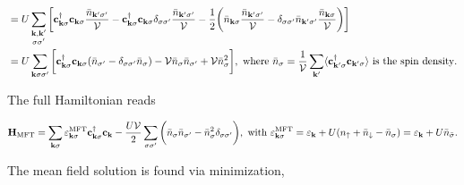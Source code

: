 \documentclass{homework}
\begin{document}
\begin{align*}
          &= U \sum_{\substack{{\bf k}, {\bf k}'\\
          {\sigma \sigma'}}} \bigg[ {\bf c}_{{\bf k}\sigma}^\dagger {\bf c}_{{\bf k}\sigma} \frac{\bar{n}_{{\bf k'} \sigma'}}{\mathcal{V}} - {\bf c}_{{\bf k}\sigma}^\dagger {\bf c}_{{\bf k}\sigma} \delta_{\sigma \sigma'} \frac{\bar{n}_{{\bf k'} \sigma'}}{\mathcal{V}} - \frac{1}{2} \bigg(\bar{n}_{{\bf k} \sigma} \frac{\bar{n}_{{\bf k'} \sigma'}}{\mathcal{V}} - \delta_{\sigma \sigma'} \bar{n}_{{\bf k'} \sigma'} \frac{\bar{n}_{{\bf k} \sigma}}{\mathcal{V}} \bigg)\bigg] \\
          &= U \sum_{{\bf k} \sigma \sigma'} \bigg[{\bf c}_{{\bf k}\sigma}^\dagger {\bf c}_{{\bf k}\sigma} (\bar{n}_{\sigma'} - \delta_{\sigma \sigma'} \bar{n}_{\sigma}) - \mathcal{V} \bar{n}_{\sigma} \bar{n}_{\sigma'} + \mathcal{V} \bar{n}_{\sigma}^2   \bigg], \textnormal{ where } \bar{n}_{\sigma} = \frac{1}{\mathcal{V}} \sum_{{\bf k'}} \langle {\bf c}_{{\bf k'}\sigma}^\dagger {\bf c}_{{\bf k'}\sigma} \rangle \textnormal{ is the spin density}.
\end{align*}

The full Hamiltonian reads

\begin{equation}
    {\bf H}_{\textnormal{MFT}} = \sum_{{\bf k} \sigma} \varepsilon_{{\bf k} \sigma}^{\textnormal{MFT}} {\bf c}_{{\bf k}\sigma}^\dagger {\bf c}_{{\bf k}} - \frac{U \mathcal{V}}{2} \sum_{\sigma \sigma'} \bigg( \bar{n}_{\sigma} \bar{n}_{\sigma'} - \bar{n}_{\sigma}^2 \delta_{\sigma \sigma'} \bigg), \textnormal{ with } \varepsilon_{{\bf k} \sigma}^{\textnormal{MFT}} = \varepsilon_{{\bf k}} + U(n_\uparrow + {\bar n}_\downarrow - \bar{n}_\sigma) = \varepsilon_{\bf k} + U\bar{n}_{\bar{\sigma}}.
\end{equation}

The mean field solution is found via minimization, 
\end{document}
